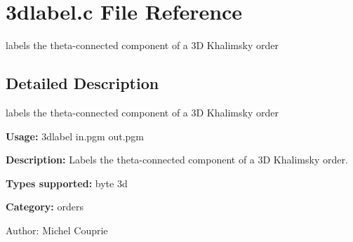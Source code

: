 \section{3dlabel.c File Reference}
\label{3dlabel_8c}
labels the theta-connected component of a 3D Khalimsky order  




\label{_details}
\subsection{Detailed Description}
labels the theta-connected component of a 3D Khalimsky order 

{\bf Usage:} 3dlabel in.pgm out.pgm

{\bf Description:} Labels the theta-connected component of a 3D Khalimsky order.

{\bf Types supported:} byte 3d

{\bf Category:} orders

\begin{Desc}
\item[Author:]Michel Couprie \end{Desc}
